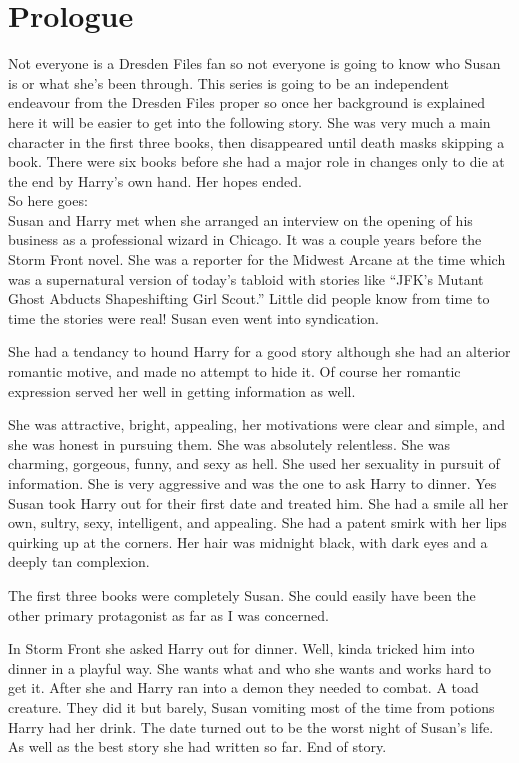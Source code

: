 \documentclass[12pt,twoside,onecolumn,openright,extrafontsizes]{memoir}
\begin{document}
\chapter*{Prologue}
{Not everyone is a Dresden Files fan so not everyone is going to know who Susan is or what she's been through. This series is going to be an independent endeavour from the Dresden Files proper so once her background is explained here it will be easier to get into the following story. She was very much a main character in the first three books, then disappeared until death masks skipping a book. There were six books before she had a major role in changes only to die at the end by Harry's own hand. Her hopes ended.\\

So here goes:\\

Susan and Harry met when she arranged an interview on the opening of his business as a professional wizard in Chicago. It was a couple years before the Storm Front novel. She was a reporter for the Midwest Arcane at the time which was a supernatural version of today's tabloid with stories like ``JFK’s Mutant Ghost Abducts Shapeshifting Girl Scout.'' Little did people know from time to time the stories were real! Susan even went into syndication.

She had a tendancy to hound Harry for a good story although she had an alterior romantic motive, and made no attempt to hide it. Of course her romantic expression served her well in getting information as well.

She was attractive, bright, appealing, her motivations were clear and simple, and she was honest in pursuing them. She was absolutely relentless. She was charming, gorgeous, funny, and sexy as hell. She used her sexuality in pursuit of information. She is very aggressive and was the one to ask Harry to dinner. Yes Susan took Harry out for their first date and treated him. She had a smile all her own, sultry, sexy, intelligent, and appealing. She had a patent smirk with her lips quirking up at the corners. Her hair was midnight black, with dark eyes and a deeply tan complexion.

The first three books were completely Susan. She could easily have been the other primary protagonist as far as I was concerned.

In Storm Front she asked Harry out for dinner. Well, kinda tricked him into dinner in a playful way. She wants what and who she wants and works hard to get it. After she and Harry ran into a demon they needed to combat. A toad creature. They did it but barely, Susan vomiting most of the time from potions Harry had her drink. The date turned out to be the worst night of Susan's life. As well as the best story she had written so far. End of story.

}
\end{document}
